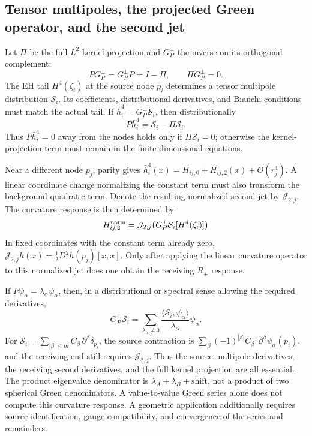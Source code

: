 \documentclass[a4paper,11pt]{article}
\numberwithin{equation}{section}
\theoremstyle{definition}
\begin{document}
\subsection{Tensor multipoles, the projected Green operator, and the second jet}\label{sec:greenjet}
Let $\Pi$ be the full $L^2$ kernel projection and $G_P^\perp$ the inverse on its orthogonal complement:
\[
P G_P^\perp=G_P^\perp P=I-\Pi,\qquad
\Pi G_P^\perp=0.
\]
The EH tail $H^4(\zeta_i)$ at the source node $p_i$ determines a tensor multipole distribution $\mathcal S_i$.
Its coefficients, distributional derivatives, and Bianchi conditions must match the actual tail.
If $\bar h_i^4=G_P^\perp\mathcal S_i$, then distributionally
\[
P\bar h_i^4=\mathcal S_i-\Pi\mathcal S_i.
\]
Thus $P\bar h_i^4=0$ away from the nodes holds only if $\Pi\mathcal S_i=0$;
otherwise the kernel-projection term must remain in the finite-dimensional equations.

Near a different node $p_j$, parity gives
$\bar h_i^4(x)=H_{ij,0}+H_{ij,2}(x)+O(r_j^4)$.
A linear coordinate change normalizing the constant term must also transform the background quadratic term.
Denote the resulting normalized second jet by $\mathcal J_{2,j}$. The curvature response is then determined by
\begin{equation}\label{eq:greenjet}
H_{ij,2}^{\rm norm}
=\mathcal J_{2,j}\!\left(G_P^\perp\mathcal S_i[H^4(\zeta_i)]\right)
\end{equation}
In fixed coordinates with the constant term already zero,
$\mathcal J_{2,j}h(x)=\frac12D^2h(p_j)[x,x]$.
Only after applying the linear curvature operator to this normalized jet does one obtain the receiving $R_\pm$ response.

If $P\psi_\alpha=\lambda_\alpha\psi_\alpha$, then, in a distributional or spectral sense allowing the required derivatives,
\[
G_P^\perp\mathcal S_i
=\sum_{\lambda_\alpha\ne0}
\frac{\langle\mathcal S_i,\psi_\alpha\rangle}{\lambda_\alpha}\psi_\alpha .
\]
For $\mathcal S_i=\sum_{|\beta|\le m}C_\beta\,\partial^\beta\delta_{p_i}$,
the source contraction is
$\sum_\beta(-1)^{|\beta|}C_\beta:\partial^\beta\psi_\alpha(p_i)$,
and the receiving end still requires $\mathcal J_{2,j}$.
Thus the source multipole derivatives, the receiving second derivatives, and the full kernel projection are all essential.
The product eigenvalue denominator is $\lambda_A+\lambda_B+\mathrm{shift}$,
not a product of two spherical Green denominators. A value-to-value Green series alone does not compute this curvature response.
A geometric application additionally requires source identification, gauge compatibility, and convergence of the series and remainders.
\end{document}
